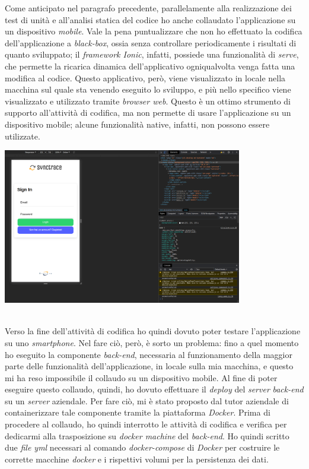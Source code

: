 Come anticipato nel paragrafo precedente, parallelamente alla realizzazione dei test di unità e all'analisi statica del codice ho anche collaudato l'applicazione su un dispositivo \textit{mobile}. Vale la pena puntualizzare che non ho effettuato la codifica dell'applicazione a \textit{black-box}, ossia senza controllare periodicamente i risultati di quanto sviluppato; il \textit{framework Ionic}, infatti, possiede una funzionalità di \textit{serve}, che permette la ricarica dinamica dell'applicativo ogniqualvolta venga fatta una modifica al codice. Questo applicativo, però, viene visualizzato in locale nella macchina sul quale sta venendo eseguito lo sviluppo, e più nello specifico viene visualizzato e utilizzato tramite \textit{browser web}. Questo è un ottimo strumento di supporto all'attività di codifica, ma non permette di usare l'applicazione su un dispositivo mobile; alcune funzionalità native, infatti, non possono essere utilizzate. \\

\begin{minipage}{\linewidth}
  \centering
    \includegraphics[height=6.8cm]{immagini/ionicserve}
\end{minipage} \\


Verso la fine dell'attività di codifica ho quindi dovuto poter testare l'applicazione su uno \textit{smartphone}. Nel fare ciò, però, è sorto un problema: fino a quel momento ho eseguito la componente \textit{back-end}, necessaria al funzionamento della maggior parte delle funzionalità dell'applicazione, in locale sulla mia macchina, e questo mi ha reso impossibile il collaudo su un dispositivo mobile. Al fine di poter eseguire questo collaudo, quindi, ho dovuto effettuare il \textit{deploy} del \textit{server} \textit{back-end} su un \textit{server} aziendale. Per fare ciò, mi è stato proposto dal tutor aziendale di containerizzare tale componente tramite la piattaforma \textit{Docker}. Prima di procedere al collaudo, ho quindi interrotto le attività di codifica e verifica per dedicarmi alla trasposizione su \textit{docker machine} del \textit{back-end}. Ho quindi scritto due \textit{file yml} necessari al comando \textit{docker-compose} di \textit{Docker} per costruire le corrette macchine \textit{docker} e i rispettivi volumi per la persistenza dei dati. \\

